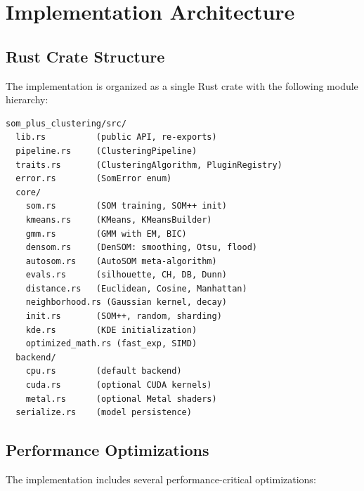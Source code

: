 \documentclass[journal]{IEEEtran}
\begin{document}
\section{Implementation Architecture}
\label{sec:architecture}

\subsection{Rust Crate Structure}

The implementation is organized as a single Rust crate with the following module hierarchy:

\begin{lstlisting}[caption={Crate module hierarchy},label={lst:crate},language={}]
som_plus_clustering/src/
  lib.rs          (public API, re-exports)
  pipeline.rs     (ClusteringPipeline)
  traits.rs       (ClusteringAlgorithm, PluginRegistry)
  error.rs        (SomError enum)
  core/
    som.rs        (SOM training, SOM++ init)
    kmeans.rs     (KMeans, KMeansBuilder)
    gmm.rs        (GMM with EM, BIC)
    densom.rs     (DenSOM: smoothing, Otsu, flood)
    autosom.rs    (AutoSOM meta-algorithm)
    evals.rs      (silhouette, CH, DB, Dunn)
    distance.rs   (Euclidean, Cosine, Manhattan)
    neighborhood.rs (Gaussian kernel, decay)
    init.rs       (SOM++, random, sharding)
    kde.rs        (KDE initialization)
    optimized_math.rs (fast_exp, SIMD)
  backend/
    cpu.rs        (default backend)
    cuda.rs       (optional CUDA kernels)
    metal.rs      (optional Metal shaders)
  serialize.rs    (model persistence)
\end{lstlisting}

\subsection{Performance Optimizations}

The implementation includes several performance-critical optimizations:
\end{document}
